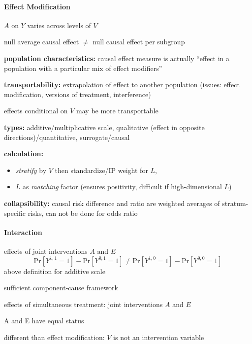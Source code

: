 \documentclass[8pt]{extarticle}
\begin{document}
\begin{multicols}{2}
\paragraph{\large Effect Modification} $A$ on $Y$ varies across levels of $V$

\noindent null average causal effect $\neq$ null causal effect per subgroup

\noindent \textbf{population characteristics:} causal effect measure is actually ``effect in a population with a particular mix of effect modifiers''

\noindent \textbf{transportability:} extrapolation of effect to another population (issues: effect modification, versions of treatment, interference)

\noindent effects conditional on $V$ may be more transportable

\noindent \textbf{types:} additive/multiplicative scale,
qualitative (effect in opposite directions)/quantitative, surrogate/causal 


\noindent \textbf{calculation:} 
\begin{itemize}[itemsep=0em, topsep=0pt, partopsep=0pt,parsep=0pt, leftmargin=1.5em]
\setlength{\itemsep}{0pt}%
\setlength{\parskip}{0pt}
\item \textit{stratify} by $V$ then standardize/IP weight for $L$, 
\item $L$ as \textit{matching} factor (ensures positivity, difficult if high-dimensional $L$)
\end{itemize}

\noindent \textbf{collapsibility:}  causal risk difference and ratio are weighted averages of stratum-specific risks, can not be done for odds ratio



\paragraph{\large Interaction} effects of joint interventions $A$ and $E$
$$\mathrm{Pr}\left[Y^{1,1}=1\right] - \mathrm{Pr}\left[Y^{0,1}=1\right] \neq \mathrm{Pr}\left[Y^{1,0}=1\right] - \mathrm{Pr}\left[Y^{0,0}=1\right]$$
above definition for additive scale


sufficient component-cause framework

effects of simultaneous treatment: joint interventions $A$ and $E$

A and E have equal status

different than effect modification: $V$ is not an intervention variable


\end{multicols}
\end{document}
